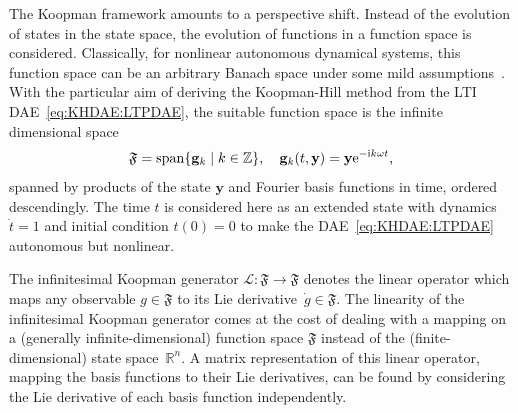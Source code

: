\documentclass[a4paper, nonatbib, 3p, twocolumn]{elsarticle}
\theoremstyle{plain}
\theoremstyle{definition}
\theoremstyle{remark}
\newcommand{\ic}{\ri} %
\newcommand{\ex}{\re} %
\newcommand{\Rspace}{\mathbb{R}}
\newcommand{\re}{\mathrm e}
\newcommand{\ri}{\mathrm i}
\newcommand{\vg}{\mathbf g}
\newcommand{\vy}{\mathbf y}
\newcommand{\cL}{\mathcal{L}}
\begin{document}
The Koopman framework amounts to a perspective shift. Instead of the evolution of states in the state space, the evolution of functions in a function space is considered. Classically, for nonlinear autonomous dynamical systems, this function space can be an arbitrary Banach space under some mild assumptions~\cite{Mauroy2020}. With the particular aim of deriving the Koopman-Hill method from the LTI DAE~\eqref{eq:KHDAE:LTPDAE}, the suitable function space is the 
infinite dimensional space
\begin{equation}\label{KHDAE:observables}
	\mathfrak{F}=\mathrm{span}\{\mathrm{\vg}_k\mid k\in\mathbb{Z}\}, \quad \mathrm{\vg}_k(t,\vy)=\vy \ex^{-\ic k\omega t}\textnormal{,}
\end{equation}
spanned by products of the state $\vy$ and Fourier basis functions in time, ordered descendingly. The time $t$ is considered here as an extended state with dynamics $\dot{t} = 1$ and initial condition $t(0) = 0$ to make the DAE~\eqref{eq:KHDAE:LTPDAE} autonomous but nonlinear. 

The infinitesimal Koopman generator $\cL: \mathfrak{F} \rightarrow \mathfrak{F}$ \cite{Mauroy2020a} denotes the linear operator which maps any observable  $g \in \mathfrak{F}$ to its Lie derivative~$\dot{g} \in \mathfrak{F}$.
The linearity of the infinitesimal Koopman generator comes at the cost of dealing with a mapping on a (generally infinite-dimensional) function space $\mathfrak{F}$ instead of the (finite-dimensional) state space~$\Rspace^n$. 
A matrix representation of this linear operator, mapping the basis functions to their Lie derivatives, can be found by considering the Lie derivative of each basis function independently. 
\end{document}
